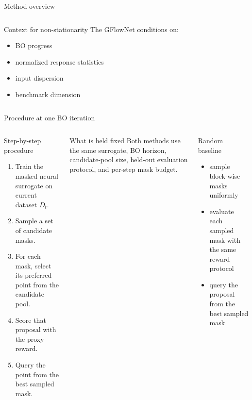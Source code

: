 \documentclass[aspectratio=169]{beamer}
\begin{document}
\begin{frame}{Method overview}
\begin{columns}[T,onlytextwidth]
\begin{minipage}[t][0.80\textheight]{\linewidth}
  \vfill

  \begin{card}{Context for non-stationarity}
  The GFlowNet conditions on:
  \begin{itemize}
    \item BO progress
    \item normalized response statistics
    \item input dispersion
    \item benchmark dimension
  \end{itemize}
  \end{card}
\end{minipage}
\end{columns}
\end{frame}

\begin{frame}{Procedure at one BO iteration}
\vspace{-0.55em}
\begin{columns}[T,onlytextwidth]
\begin{minipage}[t][0.80\textheight]{\linewidth}\vspace{0pt}
  \begin{cardA}{Step-by-step procedure}
  \begin{enumerate}
    \item Train the masked neural surrogate on current dataset $D_t$.
    \item Sample a set of candidate masks.
    \item For each mask, select its preferred point from the candidate pool.
    \item Score that proposal with the proxy reward.
    \item Query the point from the best sampled mask.
  \end{enumerate}
  \end{cardA}

  \vfill

  \begin{card}{What is held fixed}
  Both methods use the same surrogate, BO horizon, candidate-pool size, held-out evaluation protocol, and per-step mask budget.
  \end{card}
\end{minipage}

\begin{minipage}[t][0.80\textheight]{\linewidth}\vspace{0pt}
  \begin{cardG}{Random baseline}
  \begin{itemize}
    \item sample block-wise masks uniformly
    \item evaluate each sampled mask with the same reward protocol
    \item query the proposal from the best sampled mask
  \end{itemize}
  \end{cardG}


\end{minipage}
\end{columns}
\end{frame}
\end{document}
